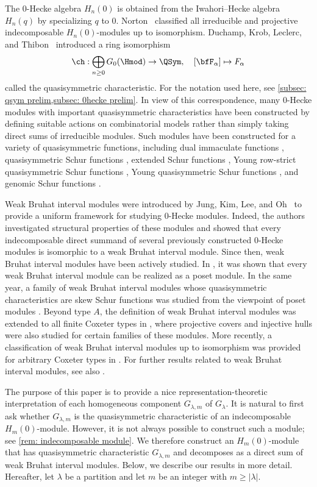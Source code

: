 \documentclass[12pt, reqno]{amsart}
\numberwithin{equation}{section}
\numberwithin{figure}{section}
\numberwithin{table}{section}
\theoremstyle{definition}
\begin{document}
The $0$-Hecke algebra $H_n(0)$ is obtained from the Iwahori--Hecke algebra $H_n(q)$ by specializing $q$ to $0$.
Norton~\cite{Norton79} classified all irreducible and projective indecomposable $H_n(0)$-modules up to isomorphism.
Duchamp, Krob, Leclerc, and Thibon~\cite{DKLT96} introduced a ring isomorphism
\[
\ch:\bigoplus_{n\ge 0} G_0(\Hmod) \rightarrow \QSym,
\quad
[\bfF_\alpha]\mapsto F_\alpha
\]
called the quasisymmetric characteristic.
For the notation used here, see \cref{subsec: qsym prelim,subsec: 0hecke prelim}.
In view of this correspondence, many $0$-Hecke modules with important quasisymmetric characteristics have been constructed by defining suitable actions on combinatorial models rather than simply taking direct sums of irreducible modules.
Such modules have been constructed for a variety of quasisymmetric functions, including dual immaculate functions \cite{BBSSZ15}, quasisymmetric Schur functions \cite{TW15}, extended Schur functions \cite{Searles20}, Young row-strict quasisymmetric Schur functions \cite{BS22}, Young quasisymmetric Schur functions \cite{CKNO22b, LO25}, and genomic Schur functions \cite{KY24}.



Weak Bruhat interval modules were introduced by Jung, Kim, Lee, and Oh~\cite{JKLO22} to provide a uniform framework for studying $0$-Hecke modules.
Indeed, the authors investigated structural properties of these modules and showed that every indecomposable direct summand of several previously constructed $0$-Hecke modules is isomorphic to a weak Bruhat interval module.
Since then, weak Bruhat interval modules have been actively studied.
In \cite{CKO24}, it was shown that every weak Bruhat interval module can be realized as a poset module.
In the same year, a family of weak Bruhat interval modules whose quasisymmetric characteristics are skew Schur functions was studied from the viewpoint of poset modules \cite{KLO24}.
Beyond type $A$, the definition of weak Bruhat interval modules was extended to all finite Coxeter types in \cite{BS25}, where projective covers and injective hulls were also studied for certain families of these modules.
More recently, a classification of weak Bruhat interval modules up to isomorphism was provided for arbitrary Coxeter types in \cite{LYY26}.
For further results related to weak Bruhat interval modules, see also \cite{DS26,Searles25,KS26}.


The purpose of this paper is to provide a nice representation-theoretic interpretation of each homogeneous component $G_{\lambda,m}$ of $G_\lambda$.
It is natural to first ask whether $G_{\lambda,m}$ is the quasisymmetric characteristic of an indecomposable $H_m(0)$-module.
However, it is not always possible to construct such a module; see \cref{rem: indecomposable module}.
We therefore construct an $H_m(0)$-module that has quasisymmetric characteristic $G_{\lambda,m}$ and decomposes as a direct sum of weak Bruhat interval modules.
Below, we describe our results in more detail.
Hereafter, let $\lambda$ be a partition and let $m$ be an integer with $m\ge|\lambda|$.
\end{document}
